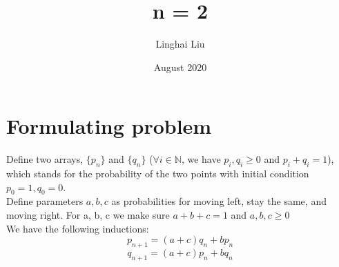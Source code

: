 \documentclass{article}
\title{n = 2}
\author{Linghai Liu}
\date{August 2020}
\begin{document}
\maketitle

\section{Formulating problem}
Define two arrays, $\{p_n\}$ and $\{q_n\}$ ($\forall i \in \mathbb{N}$, we have $p_i,q_i \geq 0$ and $p_i + q_i = 1$), which stands for the probability of the two points with initial condition $p_0=1, q_0=0$. \\
Define parameters $a, b, c$ as probabilities for moving left, stay the same, and moving right. For a, b, c we make sure $a+b+c=1$ and $a,b,c\geq0$\\

We have the following inductions:
\[p_{n+1}=(a+c)q_n+bp_n\] \[q_{n+1}=(a+c)p_n+bq_n\]
\end{document}
